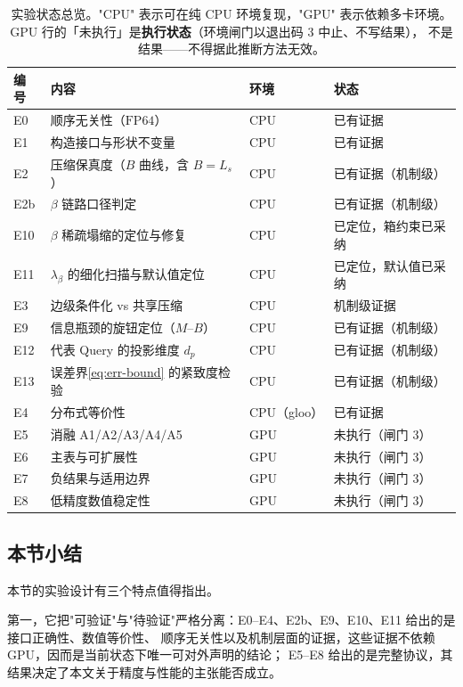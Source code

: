 \begin{table}[t]
\centering
\small
\setlength{\tabcolsep}{4pt}
\caption{实验状态总览。"CPU" 表示可在纯 CPU 环境复现，"GPU" 表示依赖多卡环境。
GPU 行的「未执行」是\textbf{执行状态}（环境闸门以退出码 3 中止、不写结果），
不是结果——不得据此推断方法无效。}
\label{tab:exp-status}
\begin{tabular}{@{}l p{} l p{}@{}}
\toprule
编号 & 内容 & 环境 & 状态 \\
\midrule
E0 & 顺序无关性（$\mathrm{FP64}$） & CPU & 已有证据 \\
E1 & 构造接口与形状不变量 & CPU & 已有证据 \\
E2 & 压缩保真度（$B$ 曲线，含 $B=L_s$） & CPU & 已有证据（机制级） \\
E2b & $\beta$ 链路口径判定 & CPU & 已有证据（机制级） \\
E10 & $\beta$ 稀疏塌缩的定位与修复 & CPU & 已定位，箱约束已采纳 \\
E11 & $\lambda_\beta$ 的细化扫描与默认值定位 & CPU & 已定位，默认值已采纳 \\
E3 & 边级条件化 vs 共享压缩 & CPU & 机制级证据 \\
E9 & 信息瓶颈的旋钮定位（$M$--$B$） & CPU & 已有证据（机制级） \\
E12 & 代表 Query 的投影维度 $d_p$ & CPU & 已有证据（机制级） \\
E13 & 误差界\eqref{eq:err-bound} 的紧致度检验 & CPU & 已有证据（机制级） \\
E4 & 分布式等价性 & CPU（gloo） & 已有证据 \\
E5 & 消融 A1/A2/A3/A4/A5 & GPU & 未执行（闸门 3） \\
E6 & 主表与可扩展性 & GPU & 未执行（闸门 3） \\
E7 & 负结果与适用边界 & GPU & 未执行（闸门 3） \\
E8 & 低精度数值稳定性 & GPU & 未执行（闸门 3） \\
\bottomrule
\end{tabular}
\end{table}

\subsection{本节小结}

本节的实验设计有三个特点值得指出。

第一，它把"可验证"与"待验证"严格分离：E0--E4、E2b、E9、E10、E11 给出的是接口正确性、数值等价性、
顺序无关性以及机制层面的证据，这些证据不依赖 GPU，因而是当前状态下唯一可对外声明的结论；
E5--E8 给出的是完整协议，其结果决定了本文关于精度与性能的主张能否成立。


